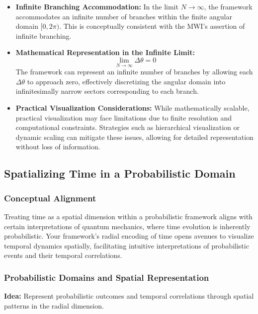 \documentclass[12pt]{article}
\begin{document}
\begin{enumerate}
\begin{itemize}
        \item \textbf{Infinite Branching Accommodation:}
        In the limit \(N \rightarrow \infty\), the framework accommodates an infinite number of branches within the finite angular domain \([0, 2\pi)\). This is conceptually consistent with the MWI's assertion of infinite branching.
        
        \item \textbf{Mathematical Representation in the Infinite Limit:}
        \[
        \lim_{N \to \infty} \Delta\theta = 0
        \]
        The framework can represent an infinite number of branches by allowing each \(\Delta\theta\) to approach zero, effectively discretizing the angular domain into infinitesimally narrow sectors corresponding to each branch.
        
        \item \textbf{Practical Visualization Considerations:}
        While mathematically scalable, practical visualization may face limitations due to finite resolution and computational constraints. Strategies such as hierarchical visualization or dynamic scaling can mitigate these issues, allowing for detailed representation without loss of information.
    \end{itemize}
    
\end{enumerate}

\subsection{Spatializing Time in a Probabilistic Domain}
\subsubsection{Conceptual Alignment}
Treating time as a spatial dimension within a probabilistic framework aligns with certain interpretations of quantum mechanics, where time evolution is inherently probabilistic. Your framework’s radial encoding of time opens avenues to visualize temporal dynamics spatially, facilitating intuitive interpretations of probabilistic events and their temporal correlations.

\subsubsection{Probabilistic Domains and Spatial Representation}
\textbf{Idea:} Represent probabilistic outcomes and temporal correlations through spatial patterns in the radial dimension.
\end{document}
